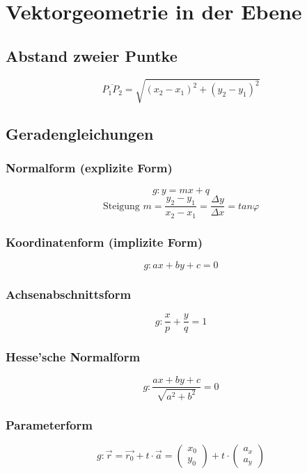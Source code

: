 \section{Vektorgeometrie in der Ebene}

\subsection{Abstand zweier Puntke}
\[ \boxed{ \overline{P_1 P_2} = \sqrt{ (x_2 - x_1)^2 + (y_2 - y_1)^2 } } \]

\subsection{Geradengleichungen}

\subsubsection{Normalform (explizite Form)}
\[ \boxed{ g: y= mx + q }\]
\[ \boxed{ \text{Steigung } m = \frac{y_2 - y_1}{x_2 - x_1} = \frac{\Delta y}{\Delta x}  = tan \varphi } \]

\subsubsection{Koordinatenform (implizite Form)}
\[ \boxed{ g: ax + by + c = 0 } \]

\subsubsection{Achsenabschnittsform}
\[ \boxed{ g: \frac{x}{p} + \frac{y}{q} = 1 } \]

\subsubsection{Hesse'sche Normalform}
\[ \boxed{ g:  \frac{ax + by + c}{\sqrt{ a^2 + b^2 } } = 0 }  \]

\subsubsection{Parameterform}
\[ \boxed{ 
	g: \vec{r} = \vec{r_0} + t \cdot \vec{a}  = 
    \left( 
		\begin{array}{cc} 
	  		x_0 \\ y_0
		\end{array}
	\right)
    + t \cdot 
    \left( 
		\begin{array}{cc} 
			a_x \\ a_y
		\end{array}
    \right)  
   }
\]


